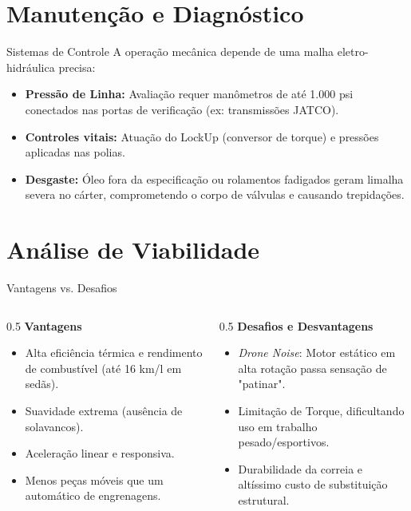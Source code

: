 \documentclass{beamer}
\begin{document}
  \section{Manutenção e Diagnóstico}

  \begin{frame}{Sistemas de Controle}
      A operação mecânica depende de uma malha eletro-hidráulica precisa:
      \begin{itemize}
          \item \textbf{Pressão de Linha:} Avaliação requer manômetros de até 1.000 psi conectados nas portas de verificação (ex: transmissões JATCO).
          \item \textbf{Controles vitais:} Atuação do LockUp (conversor de torque) e pressões aplicadas nas polias.
          \item \textbf{Desgaste:} Óleo fora da especificação ou rolamentos fadigados geram limalha severa no cárter, comprometendo o corpo de válvulas e causando trepidações.
      \end{itemize}
  \end{frame}

  \section{Análise de Viabilidade}

  \begin{frame}{Vantagens vs. Desafios}
    \begin{columns}[T]
        \begin{column}{0.5\textwidth}
            \textbf{Vantagens}
            \begin{itemize}
                \item Alta eficiência térmica e rendimento de combustível (até 16 km/l em sedãs).
                \item Suavidade extrema (ausência de solavancos).
                \item Aceleração linear e responsiva.
                \item Menos peças móveis que um automático de engrenagens.
            \end{itemize}
        \end{column}
        
        \begin{column}{0.5\textwidth}
            \textbf{Desafios e Desvantagens}
            \begin{itemize}
                \item \textit{Drone Noise}: Motor estático em alta rotação passa sensação de "patinar".
                \item Limitação de Torque, dificultando uso em trabalho pesado/esportivos.
                \item Durabilidade da correia e altíssimo custo de substituição estrutural.
            \end{itemize}
        \end{column}
    \end{columns}
  \end{frame}
\end{document}

